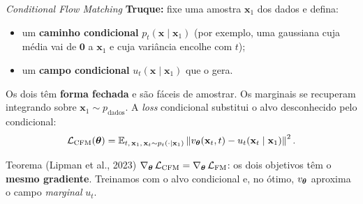 \documentclass[aspectratio=169,xcolor=dvipsnames]{beamer}
\begin{document}
  \begin{frame}{\textit{Conditional Flow Matching}}
    \textbf{Truque:} fixe uma amostra $\mathbf{x}_1$ dos dados e defina:
    \vspace{0.1em}
    \begin{itemize}
      \item um \textbf{caminho condicional}
      $p_t(\mathbf{x} \mid \mathbf{x}_1)$ (por exemplo, uma gaussiana
      cuja média vai de $\mathbf{0}$ a $\mathbf{x}_1$ e cuja variância encolhe com $t$);
      \item um \textbf{campo condicional}
      $u_t(\mathbf{x} \mid \mathbf{x}_1)$ que o gera.
    \end{itemize}
    Os dois têm \textbf{forma fechada} e são fáceis de amostrar. Os marginais
    se recuperam integrando sobre $\mathbf{x}_1 \sim p_{\text{dados}}$. A
    \textit{loss} condicional substitui o alvo desconhecido pelo condicional:
    \vspace{-0.2em}
    \[
      \mathcal{L}_{\text{CFM}}(\bm{\theta}) =
      \mathbb{E}_{t,\, \mathbf{x}_1,\, \mathbf{x}_t \sim p_t(\cdot \mid \mathbf{x}_1)}
      \left\| v_{\bm{\theta}}(\mathbf{x}_t, t) - u_t(\mathbf{x}_t \mid \mathbf{x}_1) \right\|^{2}.
    \]
    \begin{block}{Teorema (Lipman et al., 2023)}
      $\nabla_{\bm{\theta}}\, \mathcal{L}_{\text{CFM}} = \nabla_{\bm{\theta}}\, \mathcal{L}_{\text{FM}}$:
      os dois objetivos têm o \textbf{mesmo gradiente}. Treinamos com o alvo
      condicional e, no ótimo, $v_{\bm{\theta}}$ aproxima o campo
      \emph{marginal} $u_t$.
    \end{block}
  \end{frame}
\end{document}
